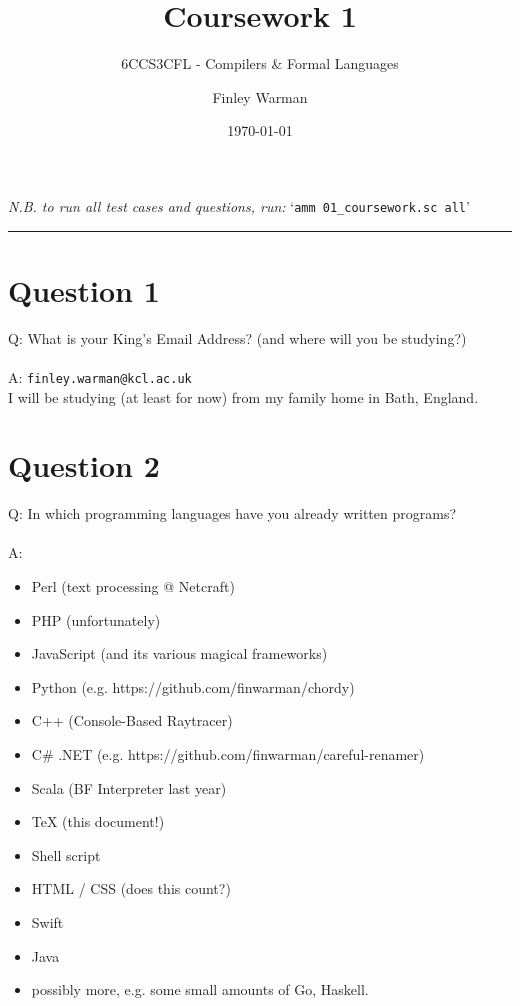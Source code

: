 \documentclass[english]{scrartcl}
\begin{document}


\subtitle{6CCS3CFL - Compilers \& Formal Languages}
\title{Coursework 1}
\author{Finley Warman}
\date{\today}

\maketitle

\begin{center}
    \textit{N.B. to run all test cases and questions, run:} `\verb|amm 01_coursework.sc all|'
\end{center}


\tableofcontents
\par\noindent\rule{\textwidth}{0.4pt}




\section*{Question 1}
Q: What is your King's Email Address? (and where will you be studying?)
\\
\\
A: \verb~finley.warman@kcl.ac.uk~ \\
I will be studying (at least for now) from my family home in Bath, England.

\section*{Question 2}
Q: In which programming languages have you already written programs?
\\
\\
A:
\begin{itemize}
    \item Perl (text processing @ Netcraft)
    \item PHP (unfortunately)
    \item JavaScript (and its various magical frameworks)
    \item Python (e.g. https://github.com/finwarman/chordy)
    \item C++ (Console-Based Raytracer)
    \item C\# .NET (e.g. https://github.com/finwarman/careful-renamer)
    \item Scala (BF Interpreter last year)
    \item TeX (this document!)
    \item Shell script
    \item HTML / CSS (does this count?)
    \item Swift
    \item Java
    \item possibly more, e.g. some small amounts of Go, Haskell.
\end{itemize}
\end{document}
